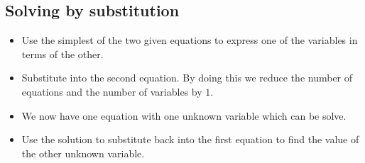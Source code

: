 \subsection*{Solving by substitution}
\begin{itemize}
 \item Use the simplest of the two given equations to express one of the variables in terms of the other.
\item Substitute into the second equation. By doing this we reduce the number of equations and the number of variables by $1$.
\item We now have one equation with one unknown variable which can be solve.
\item Use the solution to substitute back into the first equation to find the value of the other unknown variable.
\end{itemize}


